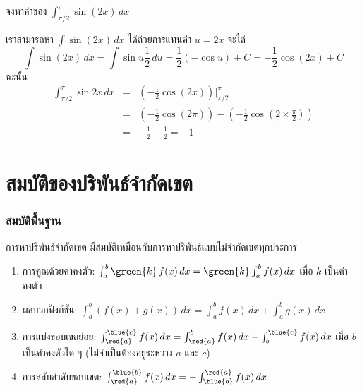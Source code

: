 \begin{frame}[t]
\begin{ex}
จงหาค่าของ $\int_{\pi/2}^{\pi} \sin (2x) \, dx$
\end{ex}
\begin{sol}
เราสามารถหา $\int \sin (2x) \,dx$ ได้ด้วยการแทนค่า $u=2x$ จะได้
\[ \int \sin (2x) \, dx= \int \sin u \frac{1}{2} \, du = \frac{1}{2} (-\cos u) + C = -\frac{1}{2} \cos (2x) + C\]
ฉะนั้น
\begin{eqnarray*}
\int_{\pi/2}^{\pi} \sin 2x \, dx &=& \left(-\frac{1}{2} \cos (2x) \right) \Big|_{\pi/2}^{\pi}\\ 
&=& \left( -\frac{1}{2} \cos (2\pi) \right) - \left( -\frac{1}{2} \cos \left( 2\times \frac{\pi}{2}\right) \right) \\
&=& -\frac{1}{2} -  \frac{1}{2} = -1
\end{eqnarray*}
\end{sol}
\end{frame}

\section[สมบัติ]{สมบัติของปริพันธ์จำกัดเขต}
\frame{\sectionpage}

\begin{frame}
\frametitle{สมบัติพื้นฐาน}
การหาปริพันธ์จำกัดเขต มีสมบัติเหมือนกับการหาปริพันธ์แบบไม่จำกัดเขตทุกประการ 
\begin{center}
\resizebox{!}{0.7\textheight}
{
\begin{prop}{}{}
\begin{enumerate}
\item การคูณด้วยค่าคงตัว: $\int_a^b \green{k} \, f(x) \, dx = \green{k} \int_a^b f(x) \, dx$ เมื่อ $k$ เป็นค่าคงตัว
\item ผลบวกฟังก์ชัน: $\int_a^b (f(x)+g(x)) \, dx  =  \int_a^b f(x) \, dx + \int_a^b g(x) \, dx$
\item การแบ่งขอบเขตย่อย: $\int_{\red{a}}^{\blue{c}} f(x)\, dx = \int_{\red{a}}^b f(x) \, dx + \int_b^{\blue{c}} f(x)\,dx$ เมื่อ $b$ เป็นค่าคงตัวใด ๆ (ไม่จำเป็นต้องอยู่ระหว่าง $a$ และ $c$)
\item การสลับลำดับขอบเขต: $\int_{\red{a}}^{\blue{b}} f(x)\, dx = -\int_{\blue{b}}^{\red{a}} f(x) \,dx$
\end{enumerate}
\end{prop}
}
\end{center}
\end{frame}



